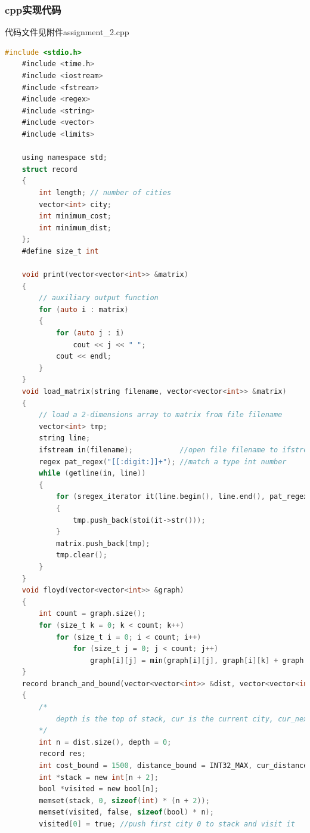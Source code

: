 \documentclass[a4paper,12pt]{article}
\begin{document}
\subsubsection{cpp实现代码}
代码文件见附件assignment\_2.cpp
\begin{lstlisting}[language=C]
    #include <stdio.h>
    #include <time.h>
    #include <iostream>
    #include <fstream>
    #include <regex>
    #include <string>
    #include <vector>
    #include <limits>

    using namespace std;
    struct record
    {
        int length; // number of cities
        vector<int> city;
        int minimum_cost;
        int minimum_dist;
    };
    #define size_t int

    void print(vector<vector<int>> &matrix)
    {
        // auxiliary output function
        for (auto i : matrix)
        {
            for (auto j : i)
                cout << j << " ";
            cout << endl;
        }
    }
    void load_matrix(string filename, vector<vector<int>> &matrix)
    {
        // load a 2-dimensions array to matrix from file filename
        vector<int> tmp;
        string line;
        ifstream in(filename);           //open file filename to ifstream
        regex pat_regex("[[:digit:]]+"); //match a type int number
        while (getline(in, line))
        {
            for (sregex_iterator it(line.begin(), line.end(), pat_regex), end_it; it != end_it; ++it)
            {
                tmp.push_back(stoi(it->str()));
            }
            matrix.push_back(tmp);
            tmp.clear();
        }
    }
    void floyd(vector<vector<int>> &graph)
    {
        int count = graph.size();
        for (size_t k = 0; k < count; k++)
            for (size_t i = 0; i < count; i++)
                for (size_t j = 0; j < count; j++)
                    graph[i][j] = min(graph[i][j], graph[i][k] + graph[k][j]);
    }
    record branch_and_bound(vector<vector<int>> &dist, vector<vector<int>> &cost, vector<vector<int>> &mindist, vector<vector<int>> &mincost)
    {
        /*
            depth is the top of stack, cur is the current city, cur_next is the next feasible city of current city, visited is flag for all cities if they are visited
        */
        int n = dist.size(), depth = 0;
        record res;
        int cost_bound = 1500, distance_bound = INT32_MAX, cur_distance = 0, cur_cost = 0;
        int *stack = new int[n + 2];
        bool *visited = new bool[n];
        memset(stack, 0, sizeof(int) * (n + 2));
        memset(visited, false, sizeof(bool) * n);
        visited[0] = true; //push first city 0 to stack and visit it

\end{lstlisting}
\end{document}
